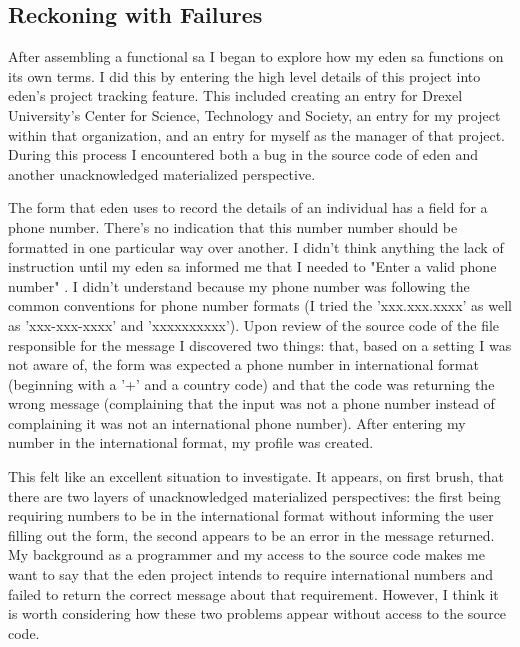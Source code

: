 \documentclass[a4paper,man,natbib,floatsintext]{apa6}
\begin{document}
   \subsection{Reckoning with Failures}
   After assembling a functional \gls{sa} I began to explore how my \acrshort{eden} \gls{sa} functions on its own terms. I did this by entering the high level details of this project into \acrshort{eden}'s project tracking feature. This included creating an entry for Drexel University's Center for Science, Technology and Society, an entry for my project within that organization, and an entry for myself as the manager of that project. During this process I encountered both a bug in the source code of \acrshort{eden} and another unacknowledged materialized perspective. 

   The form that \acrshort{eden} uses to record the details of an individual has a field for a phone number. There's no indication that this number number should be formatted in one particular way over another. I didn't think anything the lack of instruction until my \acrshort{eden} \gls{sa} informed me that I needed to "Enter a valid phone number" \citep{Konig2020-yx}. I didn't understand because my phone number was following the common conventions for phone number formats (I tried the 'xxx.xxx.xxxx' as well as 'xxx-xxx-xxxx' and 'xxxxxxxxxx'). Upon review of the source code of the file responsible for the message I discovered two things: that, based on a setting I was not aware of, the form was expected a phone number in international format (beginning with a '+' and a country code) and that the code was returning the wrong message (complaining that the input was not a phone number instead of complaining it was not an international phone number). After entering my number in the international format, my profile was created.

   This felt like an excellent situation to investigate. It appears, on first brush, that there are two layers of unacknowledged materialized perspectives: the first being requiring numbers to be in the international format without informing the user filling out the form, the second appears to be an error in the message returned. My background as a programmer and my access to the source code makes me want to say that the \acrshort{eden} project intends to require international numbers and failed to return the correct message about that requirement. However, I think it is worth considering how these two problems appear without access to the source code.
\end{document}
